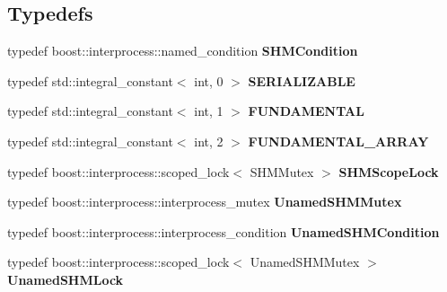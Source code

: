 \subsection*{Typedefs}
\begin{DoxyCompactItemize}
\item 
\mbox{\label{namespaceshared__memory_a98598a317e2364e30dec871c52491d3c}} 
typedef boost\+::interprocess\+::named\+\_\+condition {\bfseries S\+H\+M\+Condition}
\item 
\mbox{\label{namespaceshared__memory_af5f7fb7bbbc4c6334d59d0cd09f3ba85}} 
typedef std\+::integral\+\_\+constant$<$ int, 0 $>$ {\bfseries S\+E\+R\+I\+A\+L\+I\+Z\+A\+B\+LE}
\item 
\mbox{\label{namespaceshared__memory_a391f1de569d6b76979d6ff4591513bfd}} 
typedef std\+::integral\+\_\+constant$<$ int, 1 $>$ {\bfseries F\+U\+N\+D\+A\+M\+E\+N\+T\+AL}
\item 
\mbox{\label{namespaceshared__memory_a641fa51f2069f15b1dfb114e630fc1ba}} 
typedef std\+::integral\+\_\+constant$<$ int, 2 $>$ {\bfseries F\+U\+N\+D\+A\+M\+E\+N\+T\+A\+L\+\_\+\+A\+R\+R\+AY}
\item 
\mbox{\label{namespaceshared__memory_aa1e27e85804c1f1c0b7c1bf077add7bf}} 
typedef boost\+::interprocess\+::scoped\+\_\+lock$<$ S\+H\+M\+Mutex $>$ {\bfseries S\+H\+M\+Scope\+Lock}
\item 
\mbox{\label{namespaceshared__memory_a2a3aa667d92610e695d7948a834172f1}} 
typedef boost\+::interprocess\+::interprocess\+\_\+mutex {\bfseries Unamed\+S\+H\+M\+Mutex}
\item 
\mbox{\label{namespaceshared__memory_a83b64c7cfca3d52b46e5e9833968a7b9}} 
typedef boost\+::interprocess\+::interprocess\+\_\+condition {\bfseries Unamed\+S\+H\+M\+Condition}
\item 
\mbox{\label{namespaceshared__memory_a0b94121a6c0d65beda535a70704a1aa5}} 
typedef boost\+::interprocess\+::scoped\+\_\+lock$<$ Unamed\+S\+H\+M\+Mutex $>$ {\bfseries Unamed\+S\+H\+M\+Lock}
\item 

\end{DoxyCompactItemize}
